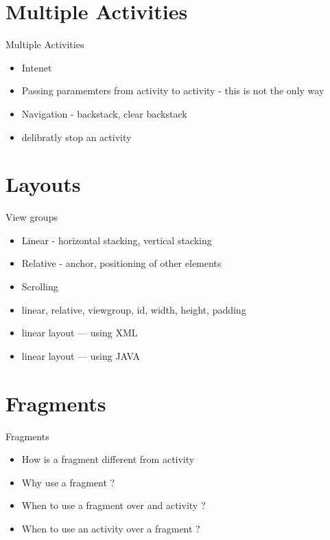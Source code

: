 \documentclass[11pt]{beamer}
\begin{document}
\section{Multiple Activities}
\begin{frame}[containsverbatim]{Multiple Activities}
	\begin{flushleft}
	\begin{itemize}
		\item Intenet
		\item Passing paramemters from activity to activity - this is not the only way
		\item Navigation - backstack, clear backstack
		\item delibratly stop an activity
	\end{itemize}
	\end{flushleft}
\end{frame}

\section{Layouts}
\begin{frame}[containsverbatim]{View groups}
	\begin{flushleft}
	\begin{itemize}
	
		\item Linear - horizontal stacking, vertical stacking
		\item Relative - anchor, positioning of other elements
		\item Scrolling
		\item linear, relative, viewgroup, id, width, height, padding
		\item linear layout --- using XML
		\item linear layout --- using JAVA  
	\end{itemize}
	\end{flushleft}
\end{frame}


\section{Fragments}
\begin{frame}[containsverbatim]{Fragments}
	\begin{flushleft}
	\begin{itemize}
		\item How is a fragment different from activity
		\item Why use a fragment ?
		\item When to use a fragment over and activity ?
		\item When to use an activity over a fragment ?
	\end{itemize}
	\end{flushleft}
\end{frame}
\end{document}
